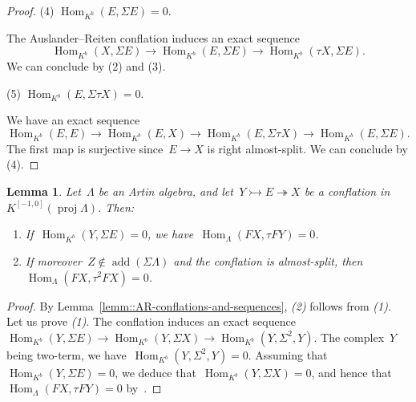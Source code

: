 \documentclass{amsart}
\newtheorem{lemma}[theorem]{Lemma}
\theoremstyle{definition}
\newcommand{\Hom}[1]{\operatorname{Hom}_{#1}}
\newcommand{\susp}{\Sigma}
\newcommand{\add}{\operatorname{add}}
\newcommand{\proj}{\operatorname{proj}}
\newcommand{\infl}{\rightarrowtail}
\newcommand{\defl}{\twoheadrightarrow}
\begin{document}
\begin{proof}
\vspace{7pt}
\noindent (4) $\Hom{K^b}(E,\susp E) = 0$.
\vspace{4pt}

The Auslander--Reiten conflation induces an exact sequence
\[
\Hom{K^b}(X,\susp E) \to \Hom{K^b}(E,\susp E) \to \Hom{K^b}(\tau X,\susp E).
\]
We can conclude by (2) and (3).

\vspace{7pt}
\noindent (5) $\Hom{K^b}(E,\susp \tau X) = 0$.
\vspace{4pt}

We have an exact sequence
\[
\Hom{K^b}(E,E) \to \Hom{K^b}(E,X) \to \Hom{K^b}(E,\susp \tau X) \to \Hom{K^b}(E,\susp E).
\]
The first map is surjective since~$E\to X$ is right almost-split.
We can conclude by (4).
\end{proof}


\begin{lemma}
Let~$\Lambda$ be an Artin algebra, and let~$Y\infl E\defl X$ be a conflation in~$K^{[-1,0]}(\proj\Lambda)$. Then:
\begin{enumerate}
 \item If~$\Hom{K^b}(Y,\susp E)=0$, we have~$\Hom{\Lambda}(FX,\tau FY)=0$.
 \item If moreover~$Z\notin\add(\susp\Lambda)$ and the conflation is almost-split, then~$\Hom{\Lambda}(FX,\tau^2 FX)=0$.
\end{enumerate}
\end{lemma}

\begin{proof}
By Lemma~\ref{lemm::AR-conflations-and-sequences}, \emph{(2)} follows from \emph{(1)}.
Let us prove \emph{(1)}.
The conflation induces an exact sequence~$\Hom{K^b}(Y,\susp E) \to \Hom{K^b}(Y,\susp X) \to \Hom{K^b}(Y,\susp^2,Y)$.
The complex~$Y$ being two-term, we have~$\Hom{K^b}(Y,\susp^2,Y)=0$.
Assuming that~$\Hom{K^b}(Y,\susp E)=0$, we deduce that~$\Hom{K^b}(Y,\susp X)=0$, and hence that~$\Hom{\Lambda}(FX,\tau FY) = 0$ by~\cite[Lemma 3.4]{AdachiIyamaReiten}.
\end{proof}

% 
\end{document}
